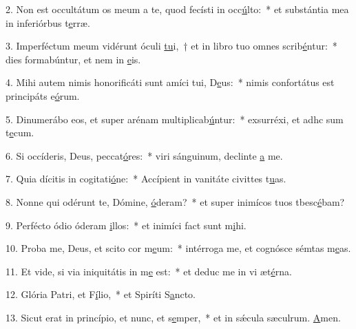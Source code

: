 2. Non est occultátum os meum a te, quod fecísti in occ\uline{ú}lto:~* et substántia mea in inferiórbus t\uline{e}rræ.\par 
3. Imperféctum meum vidérunt óculi \uline{tu}i,~† et in libro tuo omnes scrib\uline{é}ntur:~* dies formabúntur, et nem in \uline{e}is.\par 
4. Mihi autem nimis honorificáti sunt amíci tui, D\uline{e}us:~* nimis confortátus est principáts e\uline{ó}rum.\par 
5. Dinumerábo eos, et super arénam multiplicab\uline{ú}ntur:~* exsurréxi, et adhc sum t\uline{e}cum.\par 
6. Si occíderis, Deus, peccat\uline{ó}res:~* viri sánguinum, declinte \uline{a} me.\par 
7. Quia dícitis in cogitati\uline{ó}ne:~* Accípient in vanitáte civittes t\uline{u}as.\par 
8. Nonne qui odérunt te, Dómine, \uline{ó}deram?~* et super inimícos tuos tbesc\uline{é}bam?\par 
9. Perfécto ódio óderam \uline{i}llos:~* et inimíci fact sunt m\uline{i}hi.\par 
10. Proba me, Deus, et scito cor m\uline{e}um:~* intérroga me, et cognósce sémtas m\uline{e}as.\par 
11. Et vide, si via iniquitátis in m\uline{e} est:~* et deduc me in vi æt\uline{é}rna.\par 
12. Glória Patri, et F\uline{í}lio,~* et Spiríti S\uline{a}ncto.\par 
13. Sicut erat in princípio, et nunc, et s\uline{e}mper,~* et in sǽcula sæculrum. \uline{A}men.\par 
